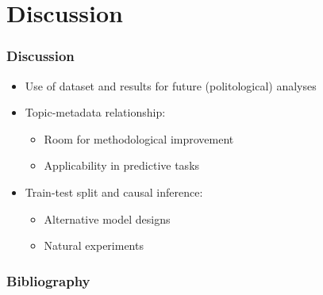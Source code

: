 \documentclass[xcolor=dvipsnames]{beamer}
\begin{document}
\section{Discussion}
\begin{frame}
\frametitle{Discussion}
\begin{itemize}
\item Use of dataset and results for future (politological) analyses
\item Topic-metadata relationship: 
	\begin{itemize}
	\item Room for methodological improvement
	\item Applicability in predictive tasks	
	\end{itemize}
\item Train-test split and causal inference:
	\begin{itemize}
	\item Alternative model designs
	\item Natural experiments	
	\end{itemize}
\end{itemize}
\end{frame}

\begin{frame}
\frametitle{Bibliography}
\printbibliography
\end{frame}
\end{document}
